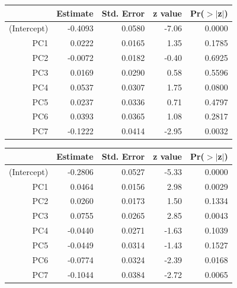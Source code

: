 \documentclass[a4paper,12pt]{Latex/Classes/PhDthesisPSnPDF}
\begin{document}
\begin{center}
\begin{table}[ht]
\centering
\begin{tabular}{rrrrr}
  \hline
 & Estimate & Std. Error & z value & Pr($>$$|$z$|$) \\ 
  \hline
(Intercept) & -0.4093 & 0.0580 & -7.06 & 0.0000 \\ 
  PC1 & 0.0222 & 0.0165 & 1.35 & 0.1785 \\ 
  PC2 & -0.0072 & 0.0182 & -0.40 & 0.6925 \\ 
  PC3 & 0.0169 & 0.0290 & 0.58 & 0.5596 \\ 
  PC4 & 0.0537 & 0.0307 & 1.75 & 0.0800 \\ 
  PC5 & 0.0237 & 0.0336 & 0.71 & 0.4797 \\ 
  PC6 & 0.0393 & 0.0365 & 1.08 & 0.2817 \\ 
  PC7 & -0.1222 & 0.0414 & -2.95 & 0.0032 \\ 
   \hline
\end{tabular}
\end{table}\end{center}

\newpage
\begin{center}
\begin{table}[ht]
\centering
\begin{tabular}{rrrrr}
  \hline
 & Estimate & Std. Error & z value & Pr($>$$|$z$|$) \\ 
  \hline
(Intercept) & -0.2806 & 0.0527 & -5.33 & 0.0000 \\ 
  PC1 & 0.0464 & 0.0156 & 2.98 & 0.0029 \\ 
  PC2 & 0.0260 & 0.0173 & 1.50 & 0.1334 \\ 
  PC3 & 0.0755 & 0.0265 & 2.85 & 0.0043 \\ 
  PC4 & -0.0440 & 0.0271 & -1.63 & 0.1039 \\ 
  PC5 & -0.0449 & 0.0314 & -1.43 & 0.1527 \\ 
  PC6 & -0.0774 & 0.0324 & -2.39 & 0.0168 \\ 
  PC7 & -0.1044 & 0.0384 & -2.72 & 0.0065 \\ 
   \hline
\end{tabular}
\end{table}\end{center}
\end{document}
